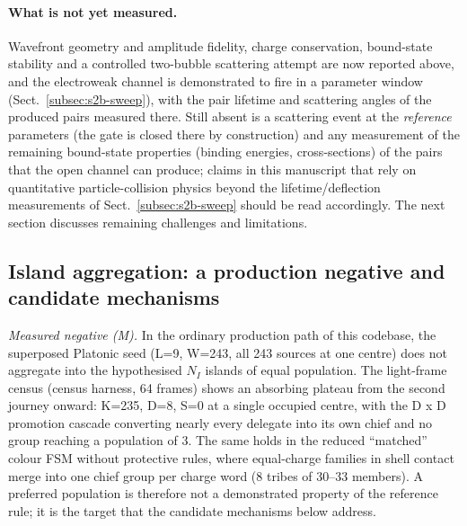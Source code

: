 \documentclass{ijuc}
\begin{document}
\paragraph{What is not yet measured.}  Wavefront geometry and amplitude fidelity, charge conservation, bound-state stability and a controlled two-bubble scattering attempt are now reported above, and the electroweak channel is demonstrated to fire in a parameter window (Sect.~\ref{subsec:s2b-sweep}), with the pair lifetime and scattering angles of the produced pairs measured there.  Still absent is a scattering event at the \emph{reference} parameters (the gate is closed there by construction) and any measurement of the remaining bound-state properties (binding energies, cross-sections) of the pairs that the open channel can produce; claims in this manuscript that rely on quantitative particle-collision physics beyond the lifetime/deflection measurements of Sect.~\ref{subsec:s2b-sweep} should be read accordingly.
The next section discusses remaining challenges and limitations.
\subsection{Island aggregation: a production negative and candidate mechanisms}\label{subsec:island-candidates}

\emph{Measured negative (M).} In the ordinary production path of this
codebase, the superposed Platonic seed (L=9, W=243, all 243 sources at one
centre) does not aggregate into the hypothesised $N_I$ islands of equal
population.  The light-frame census (census harness, 64 frames) shows an
absorbing plateau from the second journey onward: K=235, D=8, S=0 at a single
occupied centre, with the D x D promotion cascade converting nearly every
delegate into its own chief and no group reaching a population of 3.  The
same holds in the reduced ``matched'' colour FSM without protective rules,
where equal-charge families in shell contact merge into one chief group per
charge word (8 tribes of 30--33 members).  A preferred population is
therefore not a demonstrated property of the reference rule; it is the target
that the candidate mechanisms below address.
\end{document}
